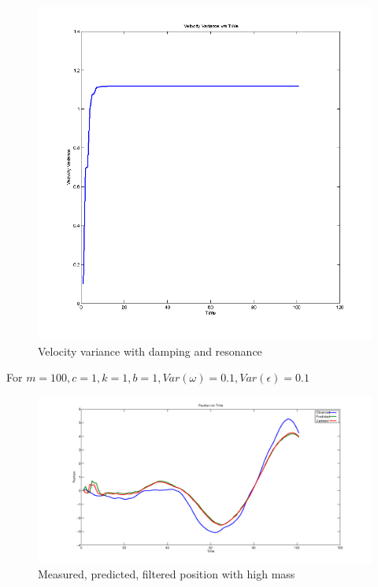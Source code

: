 \documentclass[12pt]{article}
\begin{document}
\begin{figure}
    \includegraphics[width=\linewidth]{kalman-variance2-damping}
    \caption{Velocity variance with damping and resonance}
\end{figure}


For $m=100,c=1,k=1,b=1, Var(\omega)=0.1, Var(\epsilon)=0.1$


\begin{figure}
    \includegraphics[width=\linewidth]{kalman-position-m100}
    \caption{Measured, predicted, filtered position with high mass}
\end{figure}
\end{document}
